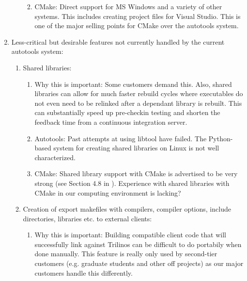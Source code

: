 \documentclass[pdf,ps2pdf,11pt]{SANDreport}
\begin{document}
\begin{enumerate}
\begin{enumerate}
\begin{enumerate}
    {}\item CMake: Direct support for MS Windows and a variety of
    other systems.  This includes creating project files for Visual
    Studio.  This is one of the major selling points for CMake over
    the autotools system.

    \end{enumerate}

  \end{enumerate}

{}\item Less-critical but desirable features not currently handled by
the current autotools system:

  \begin{enumerate}

  {}\item Shared libraries:

    \begin{enumerate}

    {}\item Why this is important: Some customers demand this.  Also,
    shared libraries can allow for much faster rebuild cycles where
    executables do not even need to be relinked after a dependant
    library is rebuilt.  This can substantially speed up pre-checkin
    testing and shorten the feedback time from a continuous
    integration server.

    {}\item Autotools: Past attempts at using libtool have failed.
    The Python-based system for creating shared libraries on Linux is
    not well characterized.

    {}\item CMake: Shared library support with CMake is advertised to
    be very strong (see Section 4.8 in
    {}\cite{MasteringCMake_fourth}).  Experience with shared libraries
    with CMake in our computing environment is lacking?

    \end{enumerate}

  {}\item Creation of export makefiles with compilers, compiler
  options, include directories, libraries etc. to external clients:

    \begin{enumerate}

    {}\item Why this is important: Building compatible client code
    that will successfully link against Trilinos can be difficult to
    do portabily when done manually.  This feature is really only used
    by second-tier customers (e.g. graduate students and other off
    projects) as our major customers handle this differently.


\end{enumerate}
\end{enumerate}
\end{enumerate}
\end{document}
